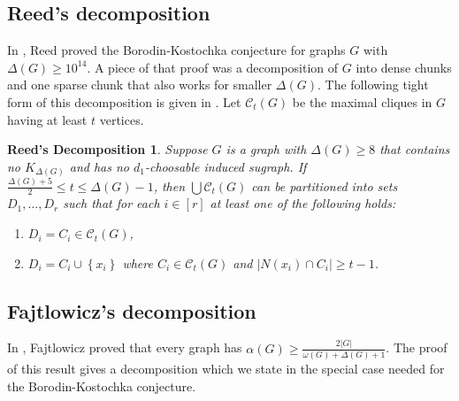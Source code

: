 \documentclass[12pt]{article}
\theoremstyle{plain}
\newtheorem*{ReedDecomp}{Reed's Decomposition}
\theoremstyle{definition}
\theoremstyle{remark}
\newcommand{\fancy}[1]{\mathcal{#1}}
\newcommand{\CC}{\fancy{C}}
\newcommand{\set}[1]{\left\{ #1 \right\}}
\newcommand{\card}[1]{\left|#1\right|}
\newcommand{\irange}[1]{\left[#1\right]}
\begin{document}
\subsection{Reed's decomposition}
In \cite{reed1999strengthening}, Reed proved the Borodin-Kostochka conjecture for graphs $G$ with $\Delta(G) \ge 10^{14}$.  A piece of that proof was a decomposition of $G$
into dense chunks and one sparse chunk that also works for smaller $\Delta(G)$.  The following tight form of this decomposition is given in \cite{denseneighborhoods}.
Let $\CC_t(G)$ be the maximal cliques in $G$ having at least $t$ vertices.

\begin{ReedDecomp}
Suppose $G$ is a graph with $\Delta(G) \ge 8$ that contains no $K_{\Delta(G)}$ and has no $d_1$-choosable induced sugraph. If
$\frac{\Delta(G) + 5}{2} \le t \le \Delta(G) - 1$, then $\bigcup \CC_t(G)$ can be
partitioned into sets $D_1, \ldots, D_r$ such that for each $i \in \irange{r}$
at least one of the following holds:
\begin{enumerate}
  \item $D_i = C_i \in \CC_t(G)$,
  \item $D_i = C_i \cup \set{x_i}$ where $C_i \in \CC_t(G)$ and $\card{N(x_i) \cap C_i} \geq t-1$.
\end{enumerate}
\end{ReedDecomp}

\subsection{Fajtlowicz's decomposition}
In \cite{fajtlowicz1984independence}, Fajtlowicz proved that every graph has $\alpha(G) \ge \frac{2\card{G}}{\omega(G) + \Delta(G) + 1}$.  The proof of this result
gives a decomposition which we state in the special case needed for the Borodin-Kostochka conjecture.
\end{document}
